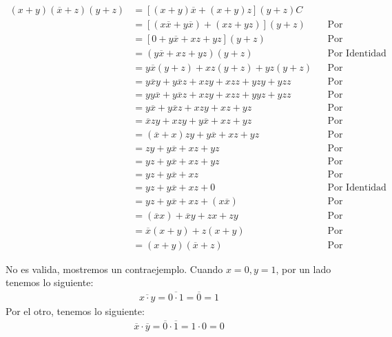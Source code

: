 \documentclass[answers]{exam}
\begin{document}
\begin{questions}
  \begin{solution}
    \begin{align*}
      (x + y)(\overline{x} + z)(y + z)
      &= [(x + y)\overline{x} + (x + y)z](y + z) C \\
      &= [(x\overline{x} + y\overline{x}) + (xz + yz)](y + z) && \text{Por Distributividad} \\
      &= [0 + y\overline{x} + xz + yz](y + z) && \text{Por Complemento} \\
      &= (y\overline{x} + xz + yz)(y + z) && \text{Por Identidad} \\
      &= y\overline{x}(y + z) + xz(y + z) + yz(y + z) && \text{Por Distributividad} \\
      &= y\overline{x}y + y\overline{x}z + xzy + xzz + yzy + yzz && \text{Por Distributividad} \\
      &= yy\overline{x} + y\overline{x}z + xzy + xzz + yyz + yzz && \text{Por Conmutatividad} \\
      &= y\overline{x} + y\overline{x}z + xzy + xz + yz && \text{Por Idempotencia} \\
      &= \overline{x}zy + xzy + y\overline{x} + xz + yz && \text{Por Conmutatividad} \\
      &= (\overline{x} + x)zy + y\overline{x} + xz + yz && \text{Por Distributividad} \\
      &= zy + y\overline{x} + xz + yz && \text{Por Complemento} \\
      &= yz + y\overline{x} + xz + yz && \text{Por Conmutatividad} \\
      &= yz + y\overline{x} + xz && \text{Por Idempotencia} \\
      &= yz + y\overline{x} + xz + 0 && \text{Por Identidad} \\
      &= yz + y\overline{x} + xz + (x\overline{x}) && \text{Por Complemento} \\
      &= (\overline{x}x) + \overline{x}y + zx + zy && \text{Por Conmutatividad} \\
      &= \overline{x}(x + y) + z(x + y) && \text{Por Distributividad} \\
      &=(x + y)(\overline{x} + z) && \text{Por Distributividad}
    \end{align*}
  \end{solution}

  \begin{solution}
    No es valida, mostremos un contraejemplo. Cuando $x=0, y=1$, por un lado
    tenemos lo siguiente:
    \begin{gather*}
      \overline{x \cdot y} = \overline{0 \cdot 1} = \overline{0} = 1
    \end{gather*}
    Por el otro, tenemos lo siguiente:
    \begin{gather*}
      \overline{x} \cdot \overline{y} = \overline{0} \cdot \overline{1}
      = 1 \cdot 0 = 0
    \end{gather*}
  \end{solution}


\end{questions}
\end{document}
